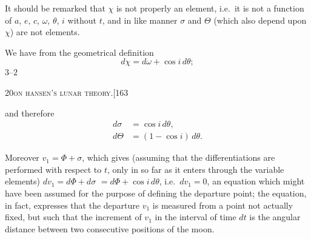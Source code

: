 \documentclass[11pt]{article}
\begin{document}
It should be remarked that $\chi$ is not properly an element, i.e.\ it is not a function
of $a$, $e$, $c$, $\omega$, $\theta$, $i$ without $t$, and in like manner $\sigma$ and $\Theta$ (which also depend upon $\chi$) are
not elements.

We have from the geometrical definition
\[
d\chi = d\omega + \cos i\,d\theta;
\]
\hfill $3$--$2$

\newpage

\begin{center}
\small\textsc{20}\hfill\textsc{on hansen's lunar theory.}\hfill[163
\end{center}

\medskip

\noindent and therefore
\begin{align*}
d\sigma &= \cos i\,d\theta,\\
d\Theta &= (1 - \cos i)\,d\theta.
\end{align*}

Moreover $v_{1} = \Phi + \sigma$, which gives (assuming that the differentiations are performed with
respect to $t$, only in so far as it enters through the variable elements) $dv_{1} = d\Phi + d\sigma$
$=d\Phi + \cos i\,d\theta$, i.e.\ $dv_{1} = 0$, an equation which might have been assumed for the purpose
of defining the departure point; the equation, in fact, expresses that the departure
$v_{1}$ is measured from a point not actually fixed, but such that the increment of $v_{1}$ in
the interval of time $dt$ is the angular distance between two consecutive positions of the
moon.
\end{document}
